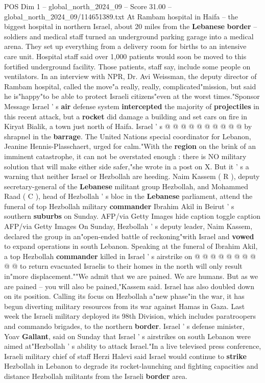 \begin{textsample}{POS Dim 1 – global\_north\_2024\_09 – Score 31.00 – global\_north\_2024\_09/114651389.txt}
At Rambam hospital in Haifa -- the biggest hospital in northern Israel, about 20 miles from the \textbf{Lebanese} \textbf{border} -- soldiers and medical staff turned an underground parking garage into a medical arena.
They set up everything from a delivery room for births to an intensive care unit.
Hospital staff said over 1,000 patients would soon be moved to this fortified underground facility.
Those patients, staff say, include some people on ventilators.
In an interview with NPR, Dr.
Avi Weissman, the deputy director of Rambam hospital, called the move"a really, really, complicated"mission, but said he is"happy"to be able to protect Israeli citizens"even at the worst times."Sponsor Message Israel ' s \textbf{air} defense system \textbf{intercepted} the majority of \textbf{projectiles} in this recent attack, but a \textbf{rocket} did damage a building and set cars on fire in Kiryat Bialik, a town just north of Haifa.
Israel ' s @ @ @ @ @ @ @ @ @ @ by shrapnel in the \textbf{barrage}.
The United Nations special coordinator for Lebanon, Jeanine Hennis-Plasschaert, urged for calm."With the \textbf{region} on the brink of an imminent catastrophe, it can not be overstated enough : there is NO military solution that will make either side safer,"she wrote in a post on X.
But it ' s a warning that neither Israel or Hezbollah are heeding.
Naim Kassem ( R ), deputy secretary-general of the \textbf{Lebanese} militant group Hezbollah, and Mohammed Raad ( C ), head of Hezbollah ' s bloc in the \textbf{Lebanese} parliament, attend the funeral of top Hezbollah military \textbf{commander} Ibrahim Akil in Beirut ' s southern \textbf{suburbs} on Sunday.
AFP/via Getty Images hide caption toggle caption AFP/via Getty Images On Sunday, Hezbollah ' s deputy leader, Naim Kassem, declared the group in an"open-ended battle of reckoning"with Israel and \textbf{vowed} to expand operations in south Lebanon.
Speaking at the funeral of Ibrahim Akil, a top Hezbollah \textbf{commander} killed in Israel ' s airstrike on @ @ @ @ @ @ @ @ @ @ to return evacuated Israelis to their homes in the north will only result in"more displacement.""We admit that we are pained.
We are humans.
But as we are pained -- you will also be pained,"Kassem said.
Israel has also doubled down on its position.
Calling its focus on Hezbollah a"new phase"in the war, it has begun diverting military resources from its war against Hamas in Gaza.
Last week the Israeli military deployed its 98th Division, which includes paratroopers and commando brigades, to the northern \textbf{border}.
Israel ' s defense minister, Yoav \textbf{Gallant}, said on Sunday that Israel ' s airstrikes on south Lebanon were aimed at"Hezbollah ' s ability to attack Israel."In a live televised press conference, Israeli military chief of staff Herzi Halevi said Israel would continue to \textbf{strike} Hezbollah in Lebanon to degrade its rocket-launching and fighting capacities and distance Hezbollah militants from the Israeli \textbf{border} area.

\end{textsample}
